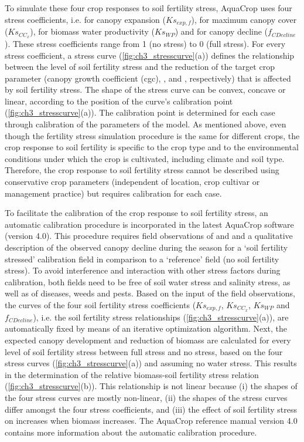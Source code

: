 To simulate these four crop responses to soil fertility stress, AquaCrop uses four stress coefficients, i.e. for canopy expansion ($Ks_{exp,f}$), for maximum canopy cover ($Ks_{CC_{x}}$), for biomass water productivity ($Ks_{WP}$) and for canopy decline ($f_{CDecline}$). These stress coefficients range from 1 (no stress) to 0 (full stress). For every stress coefficient, a stress curve (\autoref{fig:ch3_stresscurve}(a)) defines the relationship between the level of soil fertility stress and the reduction of the target crop parameter (canopy growth coefficient (cgc), \CCx, \WPster and \CC, respectively) that is affected by soil fertility stress. The shape of the stress curve can be convex, concave or linear, according to the position of the curve's calibration point (\autoref{fig:ch3_stresscurve}(a)). The calibration point is determined for each case through calibration of the parameters of the model. As mentioned above, even though the fertility stress simulation procedure is the same for different crops, the crop response to soil fertility is specific to the crop type and to the environmental conditions under which the crop is cultivated, including climate and soil type. Therefore, the crop response to soil fertility stress cannot be described using conservative crop parameters (independent of location, crop cultivar or management practice) but requires calibration for each case. 

To facilitate the calibration of the crop response to soil fertility stress, an automatic calibration procedure is incorporated in the latest AquaCrop software (version 4.0). This procedure requires field observations of \CCx and \Brel and a qualitative description of the observed canopy decline during the season for a `soil fertility stressed' calibration field in comparison to a `reference' field (no soil fertility stress). To avoid interference and interaction with other stress factors during calibration, both fields need to be free of soil water stress and salinity stress, as well as of diseases, weeds and pests. Based on the input of the field observations, the curves of the four soil fertility stress coefficients ($Ks_{exp,f}$, $Ks_{CC_{x}}$, $Ks_{WP}$ and $f_{CDecline}$), i.e. the soil fertility stress relationships (\autoref{fig:ch3_stresscurve}(a)), are automatically fixed by means of an iterative optimization algorithm. Next, the expected canopy development and reduction of biomass are calculated for every level of soil fertility stress between full stress and no stress, based on the four stress curves (\autoref{fig:ch3_stresscurve}(a)) and assuming no water stress. This results in the determination of the relative biomass-soil fertility stress relation (\autoref{fig:ch3_stresscurve}(b)). This relationship is not linear because (i) the shapes of the four stress curves are mostly non-linear, (ii) the shapes of the stress curves differ amongst the four stress coefficients, and (iii) the effect of soil fertility stress on \WPster increases when biomass increases. The AquaCrop reference manual version 4.0 \parencite{raes2012} contains more information about the automatic calibration procedure.

